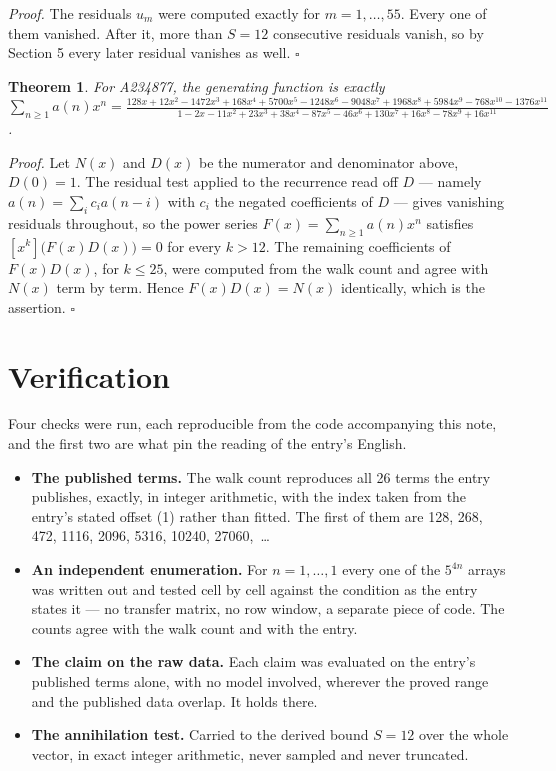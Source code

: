 \documentclass[11pt]{article}
\newtheorem{theorem}{Theorem}
\theoremstyle{definition}
\begin{document}
{\itshape Proof.} The residuals $u_m$ were computed exactly for $m = 1,\dots,55$. Every one of them vanished. After it, more than $S = 12$ consecutive residuals vanish, so by Section 5 every later residual vanishes as well. $\square$

\begin{theorem} For A234877, the generating function is exactly $\sum_{n\ge 1} a(n)x^n = \frac{128x + 12x^{2} - 1472x^{3} + 168x^{4} + 5700x^{5} - 1248x^{6} - 9048x^{7} + 1968x^{8} + 5984x^{9} - 768x^{10} - 1376x^{11}}{1 - 2x - 11x^{2} + 23x^{3} + 38x^{4} - 87x^{5} - 46x^{6} + 130x^{7} + 16x^{8} - 78x^{9} + 16x^{11}}$.\end{theorem}

{\itshape Proof.} Let $N(x)$ and $D(x)$ be the numerator and denominator above, $D(0)=1$. The residual test applied to the recurrence read off $D$ --- namely $a(n) = \sum_i c_i a(n-i)$ with $c_i$ the negated coefficients of $D$ --- gives vanishing residuals throughout, so the power series $F(x)=\sum_{n\ge 1}a(n)x^n$ satisfies $[x^k]\bigl(F(x)D(x)\bigr) = 0$ for every $k > 12$. The remaining coefficients of $F(x)D(x)$, for $k \le 25$, were computed from the walk count and agree with $N(x)$ term by term. Hence $F(x)D(x) = N(x)$ identically, which is the assertion. $\square$

\section{Verification}

Four checks were run, each reproducible from the code accompanying this note, and the first two are what pin the reading of the entry's English.

\begin{itemize}

\item {\bfseries The published terms.} The walk count reproduces all 26 terms the entry publishes, exactly, in integer arithmetic, with the index taken from the entry's stated offset (1) rather than fitted. The first of them are 128, 268, 472, 1116, 2096, 5316, 10240, 27060,~\dots

\item {\bfseries An independent enumeration.} For $n = 1,\dots,1$ every one of the $5^{4n}$ arrays was written out and tested cell by cell against the condition as the entry states it --- no transfer matrix, no row window, a separate piece of code. The counts agree with the walk count and with the entry.

\item {\bfseries The claim on the raw data.} Each claim was evaluated on the entry's published terms alone, with no model involved, wherever the proved range and the published data overlap. It holds there.

\item {\bfseries The annihilation test.} Carried to the derived bound $S = 12$ over the whole vector, in exact integer arithmetic, never sampled and never truncated.

\end{itemize}
\end{document}
